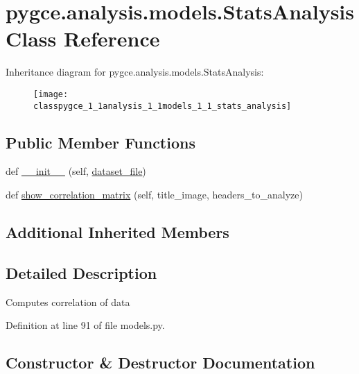 \hypertarget{classpygce_1_1analysis_1_1models_1_1_stats_analysis}{}\section{pygce.\+analysis.\+models.\+Stats\+Analysis Class Reference}
\label{classpygce_1_1analysis_1_1models_1_1_stats_analysis}
Inheritance diagram for pygce.\+analysis.\+models.\+Stats\+Analysis\+:\begin{figure}[H]
\begin{center}
\leavevmode
\texttt{[image: classpygce\_1\_1analysis\_1\_1models\_1\_1\_stats\_analysis]}
\end{center}
\end{figure}
\subsection*{Public Member Functions}
\begin{DoxyCompactItemize}
\item 
def \hyperlink{classpygce_1_1analysis_1_1models_1_1_stats_analysis_a161706ff9c5a5410356e28a240ea5e29}{\+\_\+\+\_\+init\+\_\+\+\_\+} (self, \hyperlink{classpygce_1_1analysis_1_1models_1_1_garmin_data_filter_a7bb7be05577c2d31546e27823a5d11c5}{dataset\+\_\+file})
\item 
def \hyperlink{classpygce_1_1analysis_1_1models_1_1_stats_analysis_a2dd9052d1133c137c3049c6a425f8722}{show\+\_\+correlation\+\_\+matrix} (self, title\+\_\+image, headers\+\_\+to\+\_\+analyze)
\end{DoxyCompactItemize}
\subsection*{Additional Inherited Members}


\subsection{Detailed Description}
\begin{DoxyVerb}Computes correlation of data\end{DoxyVerb}
 

Definition at line 91 of file models.\+py.



\subsection{Constructor \& Destructor Documentation}
